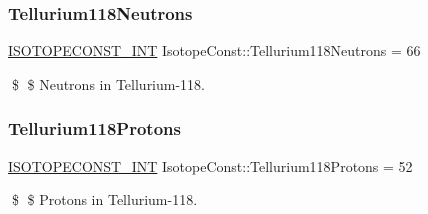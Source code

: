 \subsubsection{\texorpdfstring{Tellurium118\+Neutrons}{Tellurium118Neutrons}}
{\footnotesize\ttfamily \mbox{\hyperlink{group___isotope_const-_macros_ga5f18360b3e99483a35c32d789e62621c}{I\+S\+O\+T\+O\+P\+E\+C\+O\+N\+S\+T\+\_\+\+I\+NT}} Isotope\+Const\+::\+Tellurium118\+Neutrons = 66}

\$ \$ Neutrons in Tellurium-\/118. \mbox{\label{group___isotope_const-_tellurium-_te118_ga54a366fb9f6e635a0b68ec43fddccd96}} 
\subsubsection{\texorpdfstring{Tellurium118\+Protons}{Tellurium118Protons}}
{\footnotesize\ttfamily \mbox{\hyperlink{group___isotope_const-_macros_ga5f18360b3e99483a35c32d789e62621c}{I\+S\+O\+T\+O\+P\+E\+C\+O\+N\+S\+T\+\_\+\+I\+NT}} Isotope\+Const\+::\+Tellurium118\+Protons = 52}

\$ \$ Protons in Tellurium-\/118. 